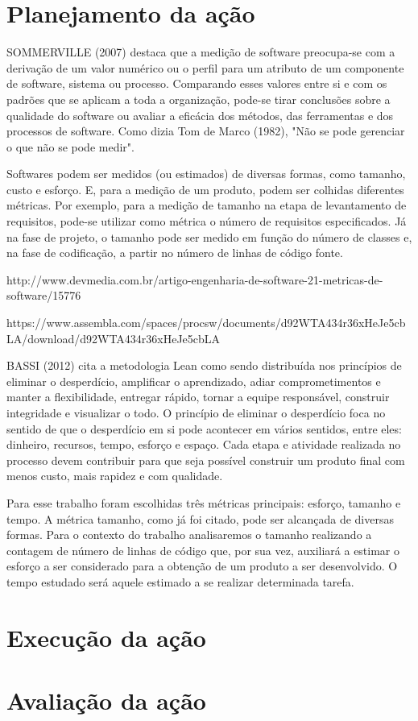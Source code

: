 	\section{Planejamento da ação}

		SOMMERVILLE (2007) destaca que a medição de software preocupa-se com a derivação de um valor numérico ou o perfil para um atributo de um componente de software, sistema ou processo. Comparando esses valores entre si e com os padrões que se aplicam a toda a organização, pode-se tirar conclusões sobre a qualidade do software ou avaliar a eficácia dos métodos, das ferramentas e dos processos de software. Como dizia Tom de Marco (1982), "Não se pode gerenciar o que não se pode medir".

		Softwares podem ser medidos (ou estimados) de diversas formas, como tamanho, custo e esforço. E, para a medição de um produto, podem ser colhidas diferentes métricas. Por exemplo, para a medição de tamanho na etapa de levantamento de requisitos, pode-se utilizar como métrica o número de requisitos especificados. Já na fase de projeto, o tamanho pode ser medido em função do número de classes e, na fase de codificação, a partir no número de linhas de código fonte.

		http://www.devmedia.com.br/artigo-engenharia-de-software-21-metricas-de-software/15776

		https://www.assembla.com/spaces/procsw/documents/d92WTA434r36xHeJe5cbLA/download/d92WTA434r36xHeJe5cbLA

		BASSI (2012) cita a metodologia Lean como sendo distribuída nos princípios de eliminar o desperdício, amplificar o aprendizado, adiar comprometimentos e manter a flexibilidade, entregar rápido, tornar a equipe responsável, construir integridade e visualizar o todo. O princípio de eliminar o desperdício foca no sentido de que o desperdício em si pode acontecer em vários sentidos, entre eles: dinheiro, recursos, tempo, esforço e espaço. Cada etapa e atividade realizada no processo devem contribuir para que seja possível construir um produto final com menos custo, mais rapidez e com qualidade.

		Para esse trabalho foram escolhidas três métricas principais: esforço, tamanho e tempo. A métrica tamanho, como já foi citado, pode ser alcançada de diversas formas. Para o contexto do trabalho analisaremos o tamanho realizando a contagem de número de linhas de código que, por sua vez, auxiliará a estimar o esforço a ser considerado para a obtenção de um produto a ser desenvolvido. O tempo estudado será aquele estimado a se realizar determinada tarefa.

\section{Execução da ação}
\section{Avaliação da ação}
